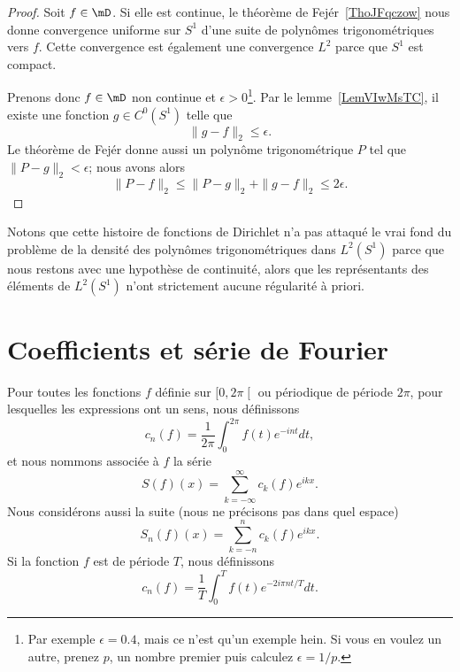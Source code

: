 \begin{proof}
	Soit \( f\in\mD\). Si elle est continue, le théorème de Fejér~\ref{ThoJFqczow} nous donne convergence uniforme sur \( S^1\) d'une suite de polynômes trigonométriques vers \( f\). Cette convergence est également une convergence \( L^2\) parce que \( S^1\) est compact.

	Prenons donc \( f\in \mD\) non continue et \( \epsilon>0\)\footnote{Par exemple \( \epsilon=0.4\), mais ce n'est qu'un exemple hein. Si vous en voulez un autre, prenez \( p\), un nombre premier puis calculez \( \epsilon=1/p\).}. Par le lemme~\ref{LemVIwMsTC}, il existe une fonction \( g\in C^0(S^1)\) telle que
	\begin{equation}
		\| g-f \|_2\leq \epsilon.
	\end{equation}
	Le théorème de Fejér donne aussi un polynôme trigonométrique \( P\) tel que \( \| P-g \|_2<\epsilon\); nous avons alors
	\begin{equation}
		\| P-f \|_2\leq \| P-g \|_{2}+\| g-f \|_2\leq 2\epsilon.
	\end{equation}
\end{proof}

Notons que cette histoire de fonctions de Dirichlet n'a pas attaqué le vrai fond du problème de la densité des polynômes trigonométriques dans \(  L^2(S^1)\) parce que nous restons avec une hypothèse de continuité, alors que les représentants des éléments de \( L^2(S^1)\) n'ont strictement aucune régularité à priori.

\section{Coefficients et série de Fourier}

\begin{definition}      \label{DEFooJUUIooNMdCtN}
	Pour toutes les fonctions \( f\) définie sur \( \mathopen[ 0 , 2\pi \mathclose[\) ou périodique de période \( 2\pi\), pour lesquelles les expressions ont un sens, nous définissons
	\begin{equation}    \label{EqNDBaXRL}
		c_n(f)=\frac{1}{ 2\pi }\int_0^{2\pi}f(t) e^{-int}dt,
	\end{equation}
	et nous nommons  associée à \( f\) la série
	\begin{equation}
		S(f)(x)=\sum_{k=-\infty}^{\infty}c_k(f) e^{ikx}.
	\end{equation}
	Nous considérons aussi la suite (nous ne précisons pas dans quel espace)
	\begin{equation}
		S_n(f)(x)=\sum_{k=-n}^nc_k(f) e^{ikx}.
	\end{equation}
	Si la fonction \( f\) est de période \( T\), nous définissons
	\begin{equation}        \label{EQooBOFSooFCJXzu}
		c_n(f)=\frac{1}{ T }\int_0^Tf(t) e^{-2 i \pi n t/T}dt.
	\end{equation}
\end{definition}

